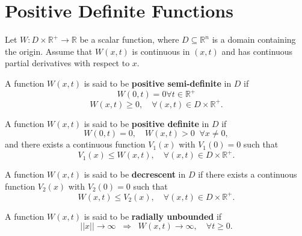 \section{Positive Definite Functions}

Let $W : D \times \mathbb{R}^+ \to \mathbb{R}$ be a scalar function, where $D \subseteq \mathbb{R}^n$ is a domain containing the origin.  
Assume that $W(x,t)$ is continuous in $(x,t)$ and has continuous partial derivatives with respect to $x$.

\begin{definition}
A function $W(x,t)$ is said to be \textbf{positive semi-definite} in $D$ if
\begin{equation}
W(0,t) = 0 \forall t \in \mathbb{R}^+
\end{equation}
\begin{equation}
W(x,t) \geq 0, \quad \forall (x,t) \in D \times \mathbb{R}^+.
\end{equation}
\end{definition}

\begin{definition}
A function $W(x,t)$ is said to be \textbf{positive definite} in $D$ if
\begin{equation}
W(0,t) = 0, \quad W(x,t) > 0 \;\; \forall x \neq 0,
\end{equation}
and there exists a continuous function $V_1(x)$ with $V_1(0)=0$ such that
\begin{equation}
V_1(x) \leq W(x,t), \quad \forall (x,t) \in D \times \mathbb{R}^+.
\end{equation}
\end{definition}

\begin{definition}
A function $W(x,t)$ is said to be \textbf{decrescent} in $D$ if there exists a continuous function $V_2(x)$ with $V_2(0)=0$ such that
\begin{equation}
W(x,t) \leq V_2(x), \quad \forall (x,t) \in D \times \mathbb{R}^+.
\end{equation}
\end{definition}

\begin{definition}
A function $W(x,t)$ is said to be \textbf{radially unbounded} if
\begin{equation}
||x|| \to \infty \;\; \Rightarrow \;\; W(x,t) \to \infty, \quad \forall t \geq 0.
\end{equation}
\end{definition}

